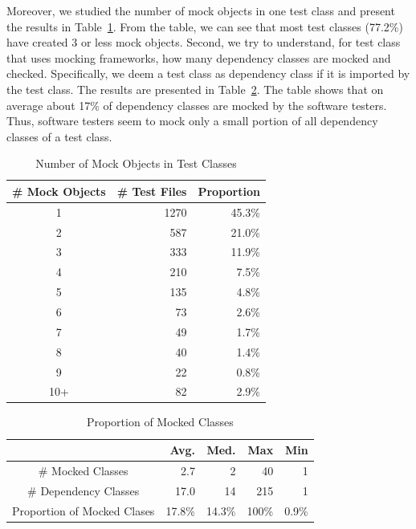 Moreover, we studied the number of mock objects in one test class and present the results in Table~\ref{table:num}. From the table, we can see that most test classes (77.2\%) have created 3 or less mock objects. Second, we try to understand, for test class that uses mocking frameworks, how many dependency classes are mocked and checked. Specifically, we deem a test class as dependency class if it is imported by the test class. The results are presented in Table~\ref{table:prop}. The table shows that on average about 17\% of dependency classes are mocked by the software testers. Thus, software testers seem to mock only a small portion of all dependency classes of a test class. 

\begin{table}
\caption{Number of Mock Objects in Test Classes}
\vspace{-0.15cm}

\label{table:num}
\centering
\begin{tabular}{|c|r|r|}
\hline
\# Mock Objects & \# Test Files & Proportion\\
\hline
1&1270 & 45.3\%\\
2&587 & 21.0\%\\
3&333 & 11.9\%\\
4&210 & 7.5\%\\
5&135 & 4.8\%\\
6&73 & 2.6\%\\
7&49 & 1.7\%\\
8&40 & 1.4\%\\
9&22 & 0.8\%\\
10+&82 & 2.9\%\\
\hline
\end{tabular}
\vspace{-0.15cm}
\end{table}


\begin{table}
\caption{Proportion of Mocked Classes}
\vspace{-0.15cm}
\label{table:prop}
\centering
\begin{tabular}{|c|r|r|r|r|}
\hline
&Avg. & Med. & Max & Min\\
\hline
\# Mocked Classes &2.7&2&40&1\\
\# Dependency Classes &17.0&14&215&1\\
Proportion of Mocked Clases &17.8\%&14.3\%&100\%&0.9\%\\
\hline
\end{tabular}
\vspace{-0.15cm}
\end{table}

